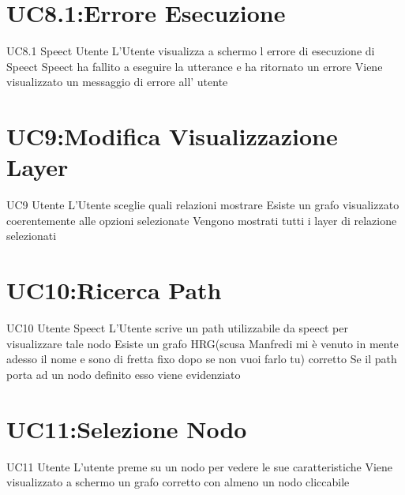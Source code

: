 \documentclass[../AnalisideiRequisiti.tex]{subfiles}
\begin{document}
\section{UC8.1:Errore Esecuzione}
\UserCase
{UC8.1}
{Speect}
{Utente}
{L'Utente visualizza a schermo l errore di esecuzione di Speect }
{Speect ha fallito a eseguire la utterance e ha ritornato un errore}
{Viene visualizzato un messaggio di errore all' utente}
{}
{}
\section{UC9:Modifica Visualizzazione Layer}
\UserCase
{UC9}
{Utente}
{}
{L'Utente sceglie quali relazioni mostrare}
{Esiste un grafo visualizzato coerentemente alle opzioni selezionate}
{Vengono mostrati tutti i layer di relazione selezionati}
{}
{}

\section{UC10:Ricerca Path}
\UserCase
{UC10}
{Utente}
{Speect}
{L'Utente scrive un path utilizzabile da speect per visualizzare tale nodo}
{Esiste un grafo HRG(scusa Manfredi mi è venuto in mente adesso il nome e sono di fretta fixo dopo se non vuoi farlo tu)
	corretto}
{Se il path porta ad un nodo definito esso viene evidenziato}
{}
{}

\section{UC11:Selezione Nodo}
\UserCase
{UC11}
{Utente}
{}
{L'utente preme su un nodo per vedere le sue caratteristiche}
{Viene visualizzato a schermo un grafo corretto con almeno un nodo cliccabile}
{}
{}
\end{document}
